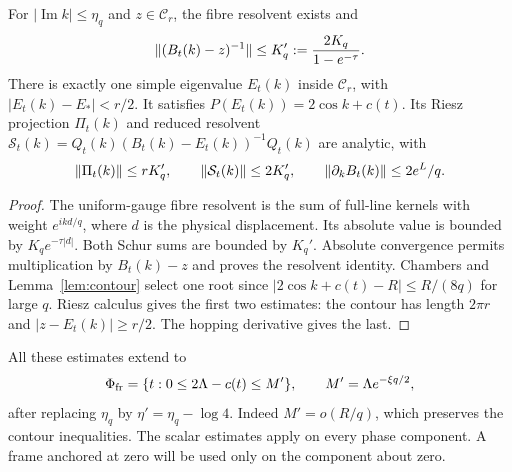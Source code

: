 \begin{lemma}\label{lem:strip}
For $|\operatorname{Im}k|\le\eta_q$ and $z\in\mathcal C_r$, the fibre resolvent exists and
\[
 \lVert (B_t(k)-z)^{-1}\rVert\le K_q':=\frac{2K_q}{1-e^{-\tau}}.
\]
There is exactly one simple eigenvalue $E_t(k)$ inside $\mathcal C_r$, with $|E_t(k)-E_*|<r/2$. It satisfies
$P(E_t(k))=2\cos k+c(t)$. Its Riesz projection $\Pi_t(k)$ and reduced resolvent
$\mathcal S_t(k)=Q_t(k)(B_t(k)-E_t(k))^{-1}Q_t(k)$ are analytic, with
\begin{equation}\label{eq:Rieszbounds}
 \lVert \Pi_t(k)\rVert\le rK_q',\qquad
 \lVert \mathcal S_t(k)\rVert\le2K_q',\qquad
 \lVert \partial_kB_t(k)\rVert\le2e^L/q.
\end{equation}
\end{lemma}
\begin{proof}
The uniform-gauge fibre resolvent is the sum of full-line kernels with weight $e^{ikd/q}$, where $d$ is the physical displacement. Its absolute value is bounded by $K_qe^{-\tau|d|}$. Both Schur sums are bounded by $K_q'$. Absolute convergence permits multiplication by $B_t(k)-z$ and proves the resolvent identity. Chambers and Lemma~\ref{lem:contour} select one root since $|2\cos k+c(t)-R|\le R/(8q)$ for large $q$. Riesz calculus gives the first two estimates: the contour has length $2\pi r$ and $|z-E_t(k)|\ge r/2$. The hopping derivative gives the last.
\end{proof}

All these estimates extend to
\[
 \Phi_{\rm fr}=\{t:0\le2\Lambda-c(t)\le M'\},\qquad M'=\Lambda e^{-\xi q/2},
\]
after replacing $\eta_q$ by $\eta' =\eta_q-\log4$. Indeed $M'=o(R/q)$, which preserves the contour inequalities. The scalar estimates apply on every phase component. A frame anchored at zero will be used only on the component about zero.

